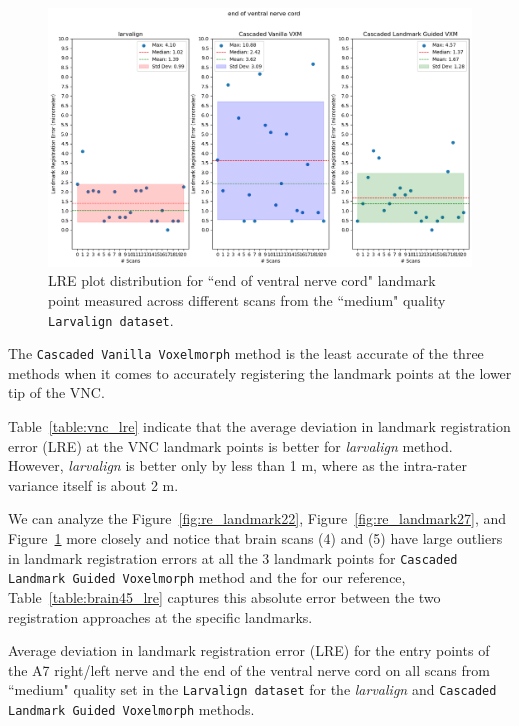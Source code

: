 \documentclass{book}
\begin{document}
	\begin{figure}[h!]
		\centering
		\includegraphics[width=0.9\columnwidth]{resources/chapter5_fresh/output/end of ventral nerve cord.png}
		\caption{LRE plot distribution for ``end of ventral nerve cord" landmark point measured across different scans from the ``medium" quality \texttt{Larvalign dataset}.}
		\label{fig:re_landmark15}
	\end{figure}
	
	The \texttt{Cascaded Vanilla Voxelmorph} method is the least accurate of the three methods when it comes to accurately registering the landmark points at the lower tip of the VNC.
	
	Table~\ref{table:vnc_lre} indicate that the average deviation in landmark registration error (LRE) at the VNC landmark points is better for \textit{larvalign} method. However, \emph{larvalign} is better only by less than 1 \textmu m, where as the intra-rater variance itself is about 2 \textmu m.
	
	We can analyze the Figure~\ref{fig:re_landmark22}, Figure~\ref{fig:re_landmark27}, and Figure~\ref{fig:re_landmark15} more closely and notice that brain scans (4) and (5) have large outliers in landmark registration errors at all the 3 landmark points for \texttt{Cascaded Landmark Guided Voxelmorph} method and the for our reference, Table~\ref{table:brain45_lre} captures this absolute error between the two registration approaches at the specific landmarks.
	
	\begin{table}[H]
		\centering
		
		\caption{Average deviation in landmark registration error (LRE) for the entry points of the A7 right/left nerve and the end of the ventral nerve cord on all scans from ``medium" quality set in the \texttt{Larvalign dataset} for the \textit{larvalign} and \texttt{Cascaded Landmark Guided Voxelmorph} methods.}
		\label{table:vnc_lre}
	\end{table}
	
\end{document}
